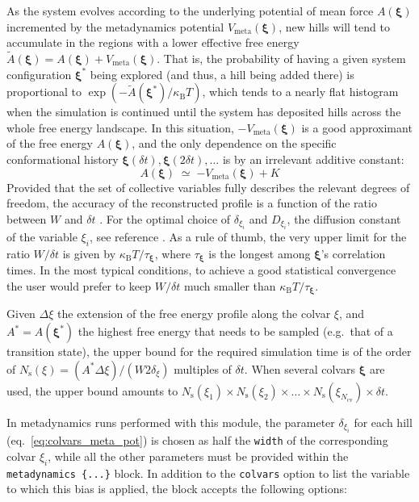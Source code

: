 As the system evolves according to the underlying potential of mean
force $A(\bm{\xi})$ incremented by the metadynamics potential
$V_{\mathrm{meta}}(\bm{\xi})$, new hills will tend to accumulate in
the regions with a lower effective free energy $\tilde{A}(\bm{\xi}) =
A(\bm{\xi})+V_{\mathrm{meta}}(\bm{\xi})$.  That is, the probability of
having a given system configuration $\bm{\xi^{*}}$ being explored (and
thus, a hill being added there) is proportional to
$\exp\left(-\tilde{A}(\bm{\xi^{*}})/\kappa_{\mathrm{B}}T\right)$,
which tends to a nearly flat histogram when the simulation is
continued until the system has deposited hills across the whole free
energy landscape.  In this situation, $-V_{\mathrm{meta}}(\bm{\xi})$
is a good approximant of the free energy $A(\bm{\xi})$, and the only
dependence on the specific conformational history
$\bm{\xi}(\delta{}t), \bm{\xi}(2\delta{}t), \ldots$ is by an
irrelevant additive constant:
\begin{equation}
  \label{eq:colvars_meta_fes}
  A(\bm{\xi}) \; \simeq \; {
    -V_{\mathrm{meta}}(\bm{\xi}) + K
  }
\end{equation}
Provided that the set of collective variables fully describes the
relevant degrees of freedom, the accuracy of the reconstructed profile
is a function of the ratio between $W$ and $\delta{}t$
\cite{Bussi2006}.  For the optimal choice of $\delta_{\xi_{i}}$ and
$D_{\xi_{i}}$, the diffusion constant of the variable $\xi_{i}$, see
reference \cite{Bussi2006}.  As a rule of thumb, the very upper limit
for the ratio $W/\delta{}t$ is given by
$\kappa_{\mathrm{B}}T/\tau_{\bm{\xi}}$, where $\tau_{\bm{\xi}}$ is the
longest among $\bm{\xi}$'s correlation times.  In the most typical
conditions, to achieve a good statistical convergence the user would
prefer to keep $W/\delta{}t$ much smaller than
$\kappa_{\mathrm{B}}T/\tau_{\bm{\xi}}$.

Given $\Delta\xi$ the extension of the free energy profile along the
colvar $\xi$, and $A^{*}=A(\bm{\xi}^{*})$ the highest free energy that
needs to be sampled (e.g.~that of a transition state), the upper bound
for the required simulation time is of the order of
$N_{\mathrm{s}}(\xi) = (A^{*}\Delta\xi)/(W2\delta_{\xi})$ multiples of
$\delta{}t$.  When several colvars $\bm{\xi}$ are used, the upper
bound amounts to $N_{\mathrm{s}}(\xi_{1}) \times
N_{\mathrm{s}}(\xi_{2}) \times \ldots \times
N_{\mathrm{s}}(\xi_{N_{\mathrm{cv}}}) \times \delta{}t$.

In metadynamics runs performed with this module, the parameter
$\delta_{\xi_{i}}$ for each hill (eq.~\ref{eq:colvars_meta_pot}) is
chosen as half the \texttt{width} of the corresponding colvar
$\xi_{i}$, while all the other parameters must be provided within the
\texttt{metadynamics~\{...\}} block.  In addition to the
\texttt{colvars} option to list the variable to which this bias is
applied, the block accepts the following options:

